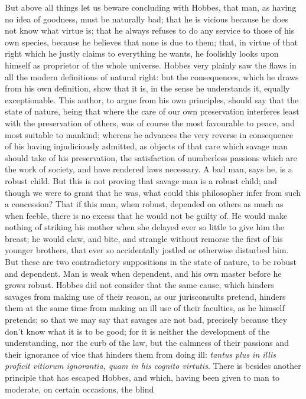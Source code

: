 \documentclass[11pt,twocolumn]{ltugboat}
\begin{document}
But above all things let us beware concluding with Hobbes, that man,
as having no idea of goodness, must be naturally bad; that he is
vicious because he does not know what virtue is; that he always
refuses to do any service to those of his own species, because he
believes that none is due to them; that, in virtue of that right which
he justly claims to everything he wants, he foolishly looks upon
himself as proprietor of the whole universe. Hobbes very plainly saw
the flaws in all the modern definitions of natural right: but the
consequences, which he draws from his own definition, show that it is,
in the sense he understands it, equally exceptionable. This author, to
argue from his own principles, should say that the state of nature,
being that where the care of our own preservation interferes least
with the preservation of others, was of course the most favourable to
peace, and most suitable to mankind; whereas he advances the very
reverse in consequence of his having injudiciously admitted, as
objects of that care which savage man should take of his preservation,
the satisfaction of numberless passions which are the work of society,
and have rendered laws necessary. A bad man, says he, is a robust
child. But this is not proving that savage man is a robust child; and
though we were to grant that he was, what could this philosopher infer
from such a concession? That if this man, when robust, depended on
others as much as when feeble, there is no excess that he would not be
guilty of. He would make nothing of striking his mother when she
delayed ever so little to give him the breast; he would claw, and
bite, and strangle without remorse the first of his younger brothers,
that ever so accidentally jostled or otherwise disturbed him. But
these are two contradictory suppositions in the state of nature, to be
robust and dependent. Man is weak when dependent, and his own master
before he grows robust. Hobbes did not consider that the same cause,
which hinders savages from making use of their reason, as our
jurisconsults pretend, hinders them at the same time from making an
ill use of their faculties, as he himself pretends; so that we may say
that savages are not bad, precisely because they don't know what it is
to be good; for it is neither the development of the understanding,
nor the curb of the law, but the calmness of their passions and their
ignorance of vice that hinders them from doing ill: \textit{tantus plus in
illis proficit vitiorum ignorantia, quam in his cognito virtutis}.
There is besides another principle that has escaped Hobbes, and which,
having been given to man to moderate, on certain occasions, the blind
\end{document}
